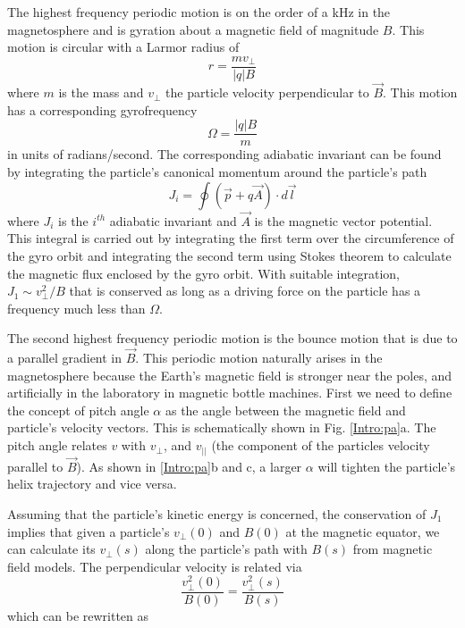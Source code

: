 The highest frequency periodic motion is on the order of a kHz in the magnetosphere and is gyration about a magnetic field of magnitude $B$. This motion is circular with a Larmor radius of 
\begin{equation}
r = \frac{m v_\perp}{|q| B}
\end{equation} where $m$ is the mass and $v_\perp$ the particle velocity perpendicular to $\vec{B}$. This motion has a corresponding gyrofrequency 
\begin{equation}
\Omega = \frac{|q| B}{m}
\end{equation} in units of radians/second. The corresponding adiabatic invariant can be found by integrating the particle's canonical momentum around the particle's path
\begin{equation}
J_i = \oint (\vec{p} + q \vec{A}) \cdot d\vec{l}
\end{equation} where $J_i$ is the $i^{th}$ adiabatic invariant and $\vec{A}$ is the magnetic vector potential. This integral is carried out by integrating the first term over the circumference of the gyro orbit and integrating the second term using Stokes theorem to calculate the magnetic flux enclosed by the gyro orbit.  With suitable integration, $J_1 \sim v_\perp^2 / B$ that is conserved as long as a driving force on the particle has a frequency much less than $\Omega$.

The second highest frequency periodic motion is the bounce motion that is due to a parallel gradient in $\vec{B}$. This periodic motion naturally arises in the magnetosphere because the Earth's magnetic field is stronger near the poles, and artificially in the laboratory in magnetic bottle machines. First we need to define the concept of pitch angle $\alpha$ as the angle between the magnetic field and particle's velocity vectors. This is schematically shown in Fig. \ref{Intro:pa}a. The pitch angle relates $v$ with $v_\perp$, and $v_{||}$ (the component of the particles velocity parallel to $\vec{B}$). As shown in \ref{Intro:pa}b and c, a larger $\alpha$ will tighten the particle's helix trajectory and vice versa.

Assuming that the particle's kinetic energy is concerned, the conservation of $J_1$ implies that given a particle's $v_\perp(0)$ and $B(0)$ at the magnetic equator, we can calculate its $v_\perp(s)$ along the particle's path with $B(s)$ from magnetic field models. The perpendicular velocity is related via
\begin{equation}
\frac{v_\perp^2 (0)}{B(0)} = \frac{v_\perp^2 (s)}{B(s)}
\end{equation} which can be rewritten as 

